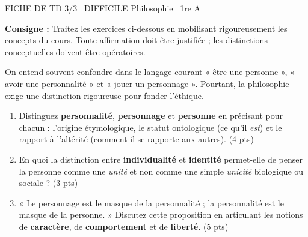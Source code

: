 \documentclass[11pt]{article}
\begin{document}
\begin{tcolorbox}[enhanced,colback=popink,colframe=popink,arc=10pt,boxrule=0pt,left=12pt,right=12pt,top=9pt,bottom=9pt]
{\color{white}\popxbold\small FICHE DE TD 3/3 \textbullet\ DIFFICILE \hfill Philosophie \textbullet\ 1re A\par}
\end{tcolorbox}
\vspace{4pt}
\noindent\textbf{Consigne :} Traitez les exercices ci-dessous en mobilisant rigoureusement les concepts du cours. Toute affirmation doit être justifiée ; les distinctions conceptuelles doivent être opératoires.

\begin{exercice}
On entend souvent confondre dans le langage courant « être une personne », « avoir une personnalité » et « jouer un personnage ». Pourtant, la philosophie exige une distinction rigoureuse pour fonder l'éthique.
\begin{enumerate}
    \item Distinguez \textbf{personnalité}, \textbf{personnage} et \textbf{personne} en précisant pour chacun : l'origine étymologique, le statut ontologique (ce qu'il \textit{est}) et le rapport à l'altérité (comment il se rapporte aux autres). (4 pts)
    \item En quoi la distinction entre \textbf{individualité} et \textbf{identité} permet-elle de penser la personne comme une \textit{unité} et non comme une simple \textit{unicité} biologique ou sociale ? (3 pts)
    \item « Le personnage est le masque de la personnalité ; la personnalité est le masque de la personne. » Discutez cette proposition en articulant les notions de \textbf{caractère}, de \textbf{comportement} et de \textbf{liberté}. (5 pts)
\end{enumerate}
\end{exercice}
\end{document}
